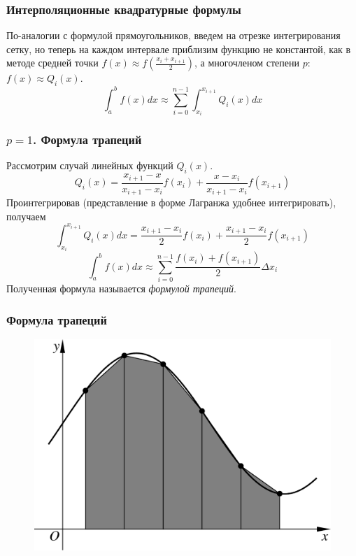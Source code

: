\documentclass[apectratio=43,unicode]{beamer}
\begin{document}
\begin{frame}
\frametitle{Интерполяционные квадратурные формулы}
	По-аналогии с формулой прямоугольников, введем на отрезке интегрирования сетку, но теперь на каждом
	интервале приблизим функцию не константой, как в методе средней точки $f(x) \approx f\left(\frac{x_i+x_{i+1}}{2}\right)$,
	а многочленом степени $p$: $f(x) \approx Q_i(x)$.
	\[
	\int_a^b f(x) dx\approx \sum_{i=0}^{n-1} \int_{x_i}^{x_{i+1}} Q_i(x) dx
	\]
\end{frame}

\begin{frame}
\frametitle{$p=1$. Формула трапеций}
	Рассмотрим случай линейных функций $Q_i(x)$.
	\[
	Q_i(x) =
	\frac{x_{i+1}-x}{x_{i+1}-x_i} f(x_i) + \frac{x-x_i}{x_{i+1}-x_i} f(x_{i+1})
	\]
	\pause
	Проинтегрировав (представление в форме Лагранжа удобнее интегрировать), получаем
	\[
	\int_{x_i}^{x_{i+1}} Q_i(x) dx = \frac{x_{i+1}-x_i}{2} f(x_i) + \frac{x_{i+1}-x_i}{2} f(x_{i+1})
	\]
	\[
	\int_a^b f(x) dx \approx \sum_{i=0}^{n-1} \frac{f(x_i)+f(x_{i+1})}{2} \Delta x_i
	\]
	Полученная формула называется \emph{формулой трапеций}.
\end{frame}

\begin{frame}
\frametitle{Формула трапеций}
	\begin{figure}%
	\includegraphics[height=.8\textheight]{trap.pdf}%
	\end{figure}
\end{frame}
\end{document}
